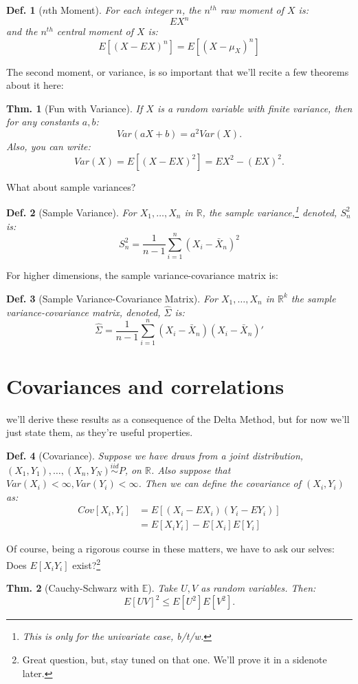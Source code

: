 \documentclass{tufte-book}
\theoremstyle{mytheoremstyle}
\newtheorem*{thm}{Thm.}
\theoremstyle{mylemstyle}
\theoremstyle{mydefstyle}
\newtheorem*{mydef}{Def.}
\begin{document}
\begin{mydef}[\(n\)th Moment] For each integer \(n\), the \(n^{th}\) raw moment of \(X\) is:
	\[EX^n\]
and the \(n^{th}\) central moment of \(X\) is:
	\[E[(X - EX)^n] = E[(X - \mu_X)^n]\]
\end{mydef}
The second moment, or variance, is so important that we'll recite a few theorems about it here:
\begin{thm}[Fun with Variance] If \(X\) is a random variable with finite variance, then for any constants \(a, b\):
	\[Var(aX + b) = a^2Var(X) \text{.}\]
Also, you can write:
	\[Var(X) = E[(X - EX)^2] = EX^2 - (EX)^2 \text{.}\]

\end{thm}
What about sample variances?
\begin{mydef}[Sample Variance] For \(X_1, \dots, X_n\) in \(\mathbb{R}\), the sample variance,\footnote{This is only for the univariate case, b/t/w.} denoted, \(S^2_n\) is:
	\[S^2_n = \frac{1}{n-1}\sum_{i = 1}^n (X_i - \bar{X}_n)^2\]
\end{mydef}
\noindent For higher dimensions, the sample variance-covariance matrix is:
\begin{mydef}[Sample Variance-Covariance Matrix] For \(X_1, \dots, X_n\) in \(\mathbb{R}^k\) the sample variance-covariance matrix, denoted, \(\hat{\Sigma}\) is:
	\[\hat{\Sigma} = \frac{1}{n-1}\sum_{i = 1}^n (X_i - \bar{X}_n)(X_i - \bar{X}_n)' \]
\end{mydef}

\section{Covariances and correlations}
 we'll derive these results as a consequence of the Delta Method, but for now we'll just state them, as they're useful properties. 
\begin{mydef}[Covariance] Suppose we have draws from a joint distribution, \((X_1, Y_1), \dots, (X_n, Y_N) \overset{iid}{\sim} P\), on \(\mathbb{R}\). Also suppose that \(Var(X_i) < \infty, Var(Y_i) < \infty\). Then we can define the covariance of \((X_i, Y_i)\) as:
	\begin{align*}
		Cov[X_i, Y_i] & = E[(X_i - EX_i)(Y_i - EY_i)] \\
				& = E[X_iY_i] - E[X_i]E[Y_i] 
	\end{align*}
\end{mydef}
\noindent Of course, being a rigorous course in these matters, we have to ask our selves: Does \(E[X_i Y_i]\) exist?\footnote{Great question, but, stay tuned on that one. We'll prove it in a sidenote later.}
\begin{thm}[Cauchy-Schwarz with \(\mathbb{E}\)] Take \(U, V\) as random variables. Then:
	\[E[UV]^2 \le E[U^2]E[V^2] \text{.}\]
\end{thm}
\end{document}
